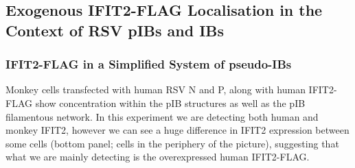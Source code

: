 \subsection{Exogenous IFIT2-FLAG Localisation in the Context of RSV pIBs and IBs} \label{subsec:Exogenous IFIT2-FLAG Localisation in the Context of RSV pIBs and IBs}
\subsubsection{IFIT2-FLAG in a Simplified System of pseudo-IBs} \label{IFIT2-FLAG in a Simplified System of pseudo-IBs}
Monkey cells transfected with human RSV N and P, along with human IFIT2-FLAG show concentration within the pIB structures as well as the pIB filamentous network. In this experiment we are detecting both human and monkey IFIT2, however we can see a huge difference in IFIT2 expression between some cells (bottom panel; cells in the periphery of the picture), suggesting that what we are mainly detecting is the overexpressed human IFIT2-FLAG.

